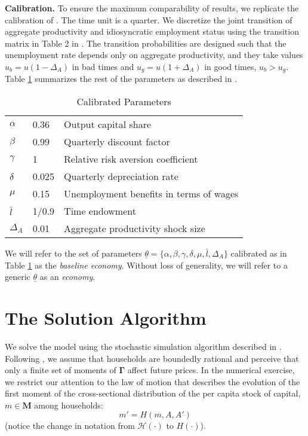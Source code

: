 \documentclass[12pt,american]{article}
\newcommand{\kdis}{\mathbf{\Gamma}}
\newcommand{\kdismomset}{\mathbf{M}}
\newcommand{\lbar}{\bar{l}}
\begin{document}
\textbf{Calibration.} To ensure the maximum comparability of results, we replicate the calibration of \citet{DenHaan2010_model}. The time unit is a quarter. We discretize the joint transition of aggregate productivity and idiosyncratic employment status using the transition matrix in Table 2 in \citet{DenHaan2010_model}. The transition probabilities are designed such that the unemployment rate depends only on aggregate productivity, and they take values $u_{b}=u(1-\Delta_{A})$ in bad times and $u_{g}=u(1+\Delta_{A})$ in good times, $u_{b}>u_{g}$. Table \ref{tab:parcal} summarizes the rest of the parameters as described in \citet{DenHaan2010_model}.

\begin{table}[ht!]
\caption{Calibrated Parameters}
\label{tab:parcal}
\vspace{-0.1in}
\begin{center}
\begin{tabular}{lll}
\toprule
$\alpha$ & 0.36  & Output capital share\\ 
$\beta$ & 0.99 & Quarterly discount factor\\
$\gamma$ & 1 & Relative risk aversion coefficient\\ 
$\delta$ & 0.025 & Quarterly depreciation rate\\ 
$\mu$  & 0.15 & Unemployment benefits in terms of wages\\ 
$\lbar$ & 1/0.9 & Time endowment\\ 
$\Delta_{A}$ & 0.01 & Aggregate productivity shock size\\
\bottomrule
\end{tabular}
\end{center}
\end{table}

We will refer to the set of parameters  $\underline{\theta}=\{\alpha,\beta,\gamma,\delta,\mu,\lbar,\Delta_{A}\}$ calibrated as in Table \ref{tab:parcal} as the \textit{baseline economy}. Without loss of generality, we will refer to a generic $\underline{\theta}$ as an \textit{economy}.

\section{The Solution Algorithm}\label{sec:alg}

We solve the model using the stochastic simulation algorithm described in \citet{MaliarMaliarValli2010}. Following \citet{KrusellSmith1998}, we assume that households are boundedly rational and perceive that only a finite set of moments of $\kdis$ affect future prices. In the numerical exercise, we restrict our attention to the law of motion that describes the evolution of the first moment of the cross-sectional distribution of the per capita stock of capital, $m\in \mathbb{\kdismomset}$ among households:
\begin{equation*}
m'=H(m,A,A')
\end{equation*}
(notice the change in notation from $\mathcal{H}(\cdot)$ to $H(\cdot)$).
\end{document}
